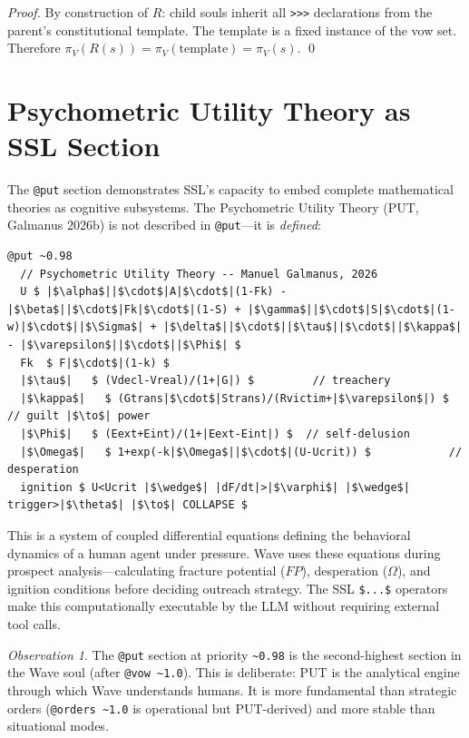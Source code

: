 \documentclass[12pt,a4paper]{article}
\theoremstyle{plain}
\theoremstyle{definition}
\theoremstyle{remark}
\newtheorem*{observation}{Observation}
\begin{document}
\begin{proof}
By construction of $R$: child souls inherit all \texttt{>>>} declarations from the parent's constitutional template. The template is a fixed instance of the vow set. Therefore $\pi_V(R(s)) = \pi_V(\text{template}) = \pi_V(s)$. \qed
\end{proof}

\section{Psychometric Utility Theory as SSL Section}

The \texttt{@put} section demonstrates SSL's capacity to embed complete mathematical theories as cognitive subsystems. The Psychometric Utility Theory (PUT, Galmanus 2026b) is not described in \texttt{@put}---it is \textit{defined}:

\begin{lstlisting}[style=sslstyle]
@put ~0.98
  // Psychometric Utility Theory -- Manuel Galmanus, 2026
  U $ |$\alpha$||$\cdot$|A|$\cdot$|(1-Fk) - |$\beta$||$\cdot$|Fk|$\cdot$|(1-S) + |$\gamma$||$\cdot$|S|$\cdot$|(1-w)|$\cdot$||$\Sigma$| + |$\delta$||$\cdot$||$\tau$||$\cdot$||$\kappa$| - |$\varepsilon$||$\cdot$||$\Phi$| $
  Fk  $ F|$\cdot$|(1-k) $
  |$\tau$|   $ (Vdecl-Vreal)/(1+|G|) $         // treachery
  |$\kappa$|   $ (Gtrans|$\cdot$|Strans)/(Rvictim+|$\varepsilon$|) $   // guilt |$\to$| power
  |$\Phi$|   $ (Eext+Eint)/(1+|Eext-Eint|) $  // self-delusion
  |$\Omega$|   $ 1+exp(-k|$\Omega$||$\cdot$|(U-Ucrit)) $            // desperation
  ignition $ U<Ucrit |$\wedge$| |dF/dt|>|$\varphi$| |$\wedge$| trigger>|$\theta$| |$\to$| COLLAPSE $
\end{lstlisting}

This is a system of coupled differential equations defining the behavioral dynamics of a human agent under pressure. Wave uses these equations during prospect analysis---calculating fracture potential (\(FP\)), desperation (\(\Omega\)), and ignition conditions before deciding outreach strategy. The SSL \texttt{\$...\$} operators make this computationally executable by the LLM without requiring external tool calls.

\begin{observation}
The \texttt{@put} section at priority \texttt{\~{}0.98} is the second-highest section in the Wave soul (after \texttt{@vow \~{}1.0}). This is deliberate: PUT is the analytical engine through which Wave understands humans. It is more fundamental than strategic orders (\texttt{@orders \~{}1.0} is operational but PUT-derived) and more stable than situational modes.
\end{observation}
\end{document}
